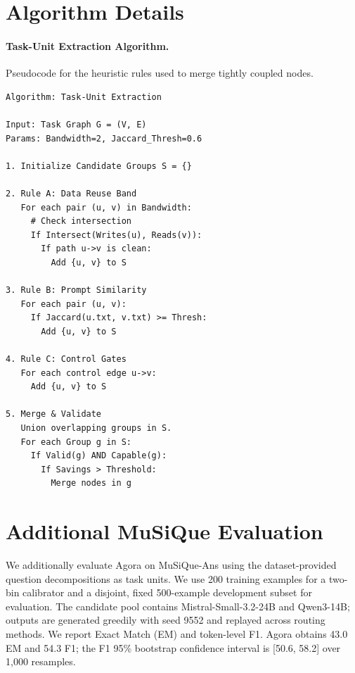 \documentclass[11pt]{article}
\begin{document}
\section{Algorithm Details}
\label{app:algo}

\paragraph{Task-Unit Extraction Algorithm.}
Pseudocode for the heuristic rules used to merge tightly coupled nodes.

\begin{scriptsize}
\begin{verbatim}
Algorithm: Task-Unit Extraction

Input: Task Graph G = (V, E)
Params: Bandwidth=2, Jaccard_Thresh=0.6

1. Initialize Candidate Groups S = {}

2. Rule A: Data Reuse Band
   For each pair (u, v) in Bandwidth:
     # Check intersection
     If Intersect(Writes(u), Reads(v)):
       If path u->v is clean:
         Add {u, v} to S

3. Rule B: Prompt Similarity
   For each pair (u, v):
     If Jaccard(u.txt, v.txt) >= Thresh:
       Add {u, v} to S

4. Rule C: Control Gates
   For each control edge u->v:
     Add {u, v} to S

5. Merge & Validate
   Union overlapping groups in S.
   For each Group g in S:
     If Valid(g) AND Capable(g):
       If Savings > Threshold:
         Merge nodes in g
\end{verbatim}
\end{scriptsize}

\section{Additional MuSiQue Evaluation}
\label{app:musique}

We additionally evaluate Agora on MuSiQue-Ans \citep{trivedi2022musique} using the dataset-provided question decompositions as task units. We use 200 training examples for a two-bin calibrator and a disjoint, fixed 500-example development subset for evaluation. The candidate pool contains Mistral-Small-3.2-24B and Qwen3-14B; outputs are generated greedily with seed 9552 and replayed across routing methods. We report Exact Match (EM) and token-level F1. Agora obtains 43.0 EM and 54.3 F1; the F1 95\% bootstrap confidence interval is [50.6, 58.2] over 1,000 resamples.
\end{document}
